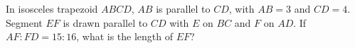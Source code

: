 In isosceles trapezoid $ABCD$, $AB$ is parallel to $CD$, with $AB=3$ and $CD=4$. Segment $EF$ is drawn parallel to $CD$ with $E$ on $BC$ and $F$ on $AD$. If $AF:FD=15:16$, what is the length of $EF$?
